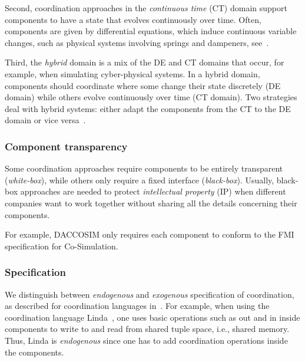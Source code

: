 \documentclass[runningheads]{llncs}
\begin{document}
Second, coordination approaches in the \textit{continuous time} (CT) domain support components to have a state that evolves continuously over time.
Often, components are given by differential equations, which induce continuous variable changes, such as physical systems involving springs and dampeners, see~\cite{gomesCoSimulationSurvey2019}.

Third, the \textit{hybrid} domain is a mix of the DE and CT domains that occur, for example, when simulating cyber-physical systems.
In a hybrid domain, components should coordinate where some change their state discretely (DE domain) while others evolve continuously over time (CT domain).
Two strategies deal with hybrid systems: either adapt the components from the CT to the DE domain or vice versa~\cite{gomesCoSimulationSurvey2019}.


\subsubsection{Component transparency} Some coordination approaches require components to be entirely transparent (\textit{white-box}), while others only require a fixed interface (\textit{black-box}).
Usually, black-box approaches are needed to protect \textit{intellectual property} (IP) when different companies want to work together without sharing all the details concerning their components.

For example, DACCOSIM only requires each component to conform to the FMI specification for Co-Simulation.

\subsubsection{Specification} We distinguish between \textit{endogenous} and \textit{exogenous} specification of coordination, as described for coordination languages in~\cite{arbabWhatYouMean1998}.
For example, when using the coordination language Linda~\cite{carrieroLindaContext1989}, one uses basic operations such as \textsf{out} and \textsf{in} inside components to write to and read from shared tuple space, i.e., shared memory.
Thus, Linda is \textit{endogenous} since one has to add coordination operations inside the components.
\end{document}
